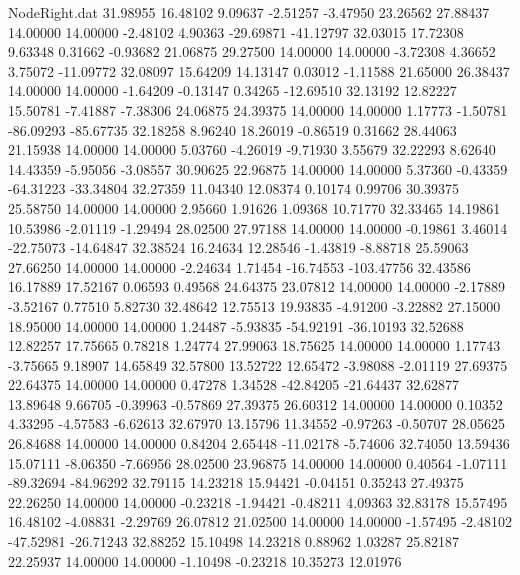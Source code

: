 \begin{filecontents}{NodeRight.dat}
  31.98955   16.48102    9.09637    -2.51257   -3.47950   23.26562   27.88437   14.00000   14.00000   -2.48102    4.90363  -29.69871  -41.12797
  32.03015   17.72308    9.63348     0.31662   -0.93682   21.06875   29.27500   14.00000   14.00000   -3.72308    4.36652    3.75072  -11.09772
  32.08097   15.64209   14.13147     0.03012   -1.11588   21.65000   26.38437   14.00000   14.00000   -1.64209   -0.13147    0.34265  -12.69510
  32.13192   12.82227   15.50781    -7.41887   -7.38306   24.06875   24.39375   14.00000   14.00000    1.17773   -1.50781  -86.09293  -85.67735
  32.18258    8.96240   18.26019    -0.86519    0.31662   28.44063   21.15938   14.00000   14.00000    5.03760   -4.26019   -9.71930    3.55679
  32.22293    8.62640   14.43359    -5.95056   -3.08557   30.90625   22.96875   14.00000   14.00000    5.37360   -0.43359  -64.31223  -33.34804
  32.27359   11.04340   12.08374     0.10174    0.99706   30.39375   25.58750   14.00000   14.00000    2.95660    1.91626    1.09368   10.71770
  32.33465   14.19861   10.53986    -2.01119   -1.29494   28.02500   27.97188   14.00000   14.00000   -0.19861    3.46014  -22.75073  -14.64847
  32.38524   16.24634   12.28546    -1.43819   -8.88718   25.59063   27.66250   14.00000   14.00000   -2.24634    1.71454  -16.74553 -103.47756
  32.43586   16.17889   17.52167     0.06593    0.49568   24.64375   23.07812   14.00000   14.00000   -2.17889   -3.52167    0.77510    5.82730
  32.48642   12.75513   19.93835    -4.91200   -3.22882   27.15000   18.95000   14.00000   14.00000    1.24487   -5.93835  -54.92191  -36.10193
  32.52688   12.82257   17.75665     0.78218    1.24774   27.99063   18.75625   14.00000   14.00000    1.17743   -3.75665    9.18907   14.65849
  32.57800   13.52722   12.65472    -3.98088   -2.01119   27.69375   22.64375   14.00000   14.00000    0.47278    1.34528  -42.84205  -21.64437
  32.62877   13.89648    9.66705    -0.39963   -0.57869   27.39375   26.60312   14.00000   14.00000    0.10352    4.33295   -4.57583   -6.62613
  32.67970   13.15796   11.34552    -0.97263   -0.50707   28.05625   26.84688   14.00000   14.00000    0.84204    2.65448  -11.02178   -5.74606
  32.74050   13.59436   15.07111    -8.06350   -7.66956   28.02500   23.96875   14.00000   14.00000    0.40564   -1.07111  -89.32694  -84.96292
  32.79115   14.23218   15.94421    -0.04151    0.35243   27.49375   22.26250   14.00000   14.00000   -0.23218   -1.94421   -0.48211    4.09363
  32.83178   15.57495   16.48102    -4.08831   -2.29769   26.07812   21.02500   14.00000   14.00000   -1.57495   -2.48102  -47.52981  -26.71243
  32.88252   15.10498   14.23218     0.88962    1.03287   25.82187   22.25937   14.00000   14.00000   -1.10498   -0.23218   10.35273   12.01976

\end{filecontents}
